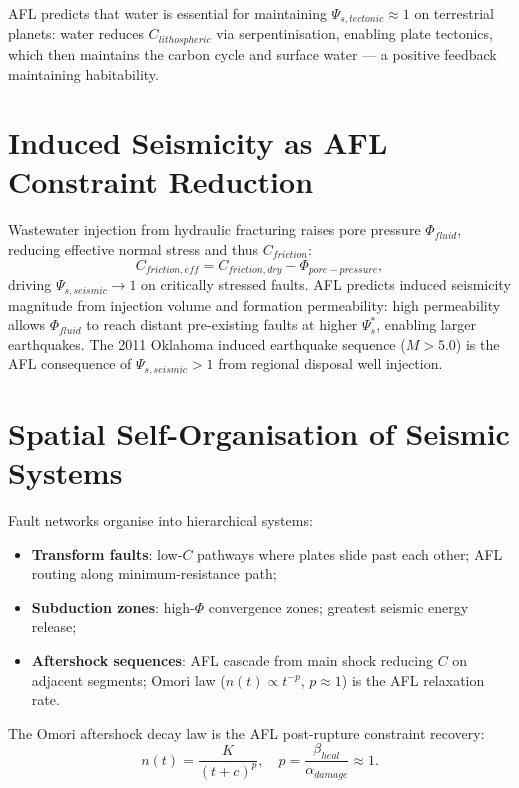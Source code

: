 \documentclass[11pt]{article}
\begin{document}
AFL predicts that water is essential for maintaining $\Psi_{s,tectonic} \approx 1$ on terrestrial
planets: water reduces $C_{lithospheric}$ via serpentinisation, enabling plate tectonics, which
then maintains the carbon cycle and surface water --- a positive feedback maintaining habitability.

\section{Induced Seismicity as AFL Constraint Reduction}

Wastewater injection from hydraulic fracturing raises pore pressure $\Phi_{fluid}$, reducing
effective normal stress and thus $C_{friction}$:
\begin{equation}
C_{friction,eff} = C_{friction,dry} - \Phi_{pore-pressure},
\end{equation}
driving $\Psi_{s,seismic} \to 1$ on critically stressed faults. AFL predicts induced seismicity
magnitude from injection volume and formation permeability: high permeability allows $\Phi_{fluid}$
to reach distant pre-existing faults at higher $\Psi_s^*$, enabling larger earthquakes. The 2011
Oklahoma induced earthquake sequence ($M > 5.0$) is the AFL consequence of $\Psi_{s,seismic} > 1$
from regional disposal well injection.

\section{Spatial Self-Organisation of Seismic Systems}

Fault networks organise into hierarchical systems:
\begin{itemize}
    \item \textbf{Transform faults}: low-$C$ pathways where plates slide past each other; AFL
          routing along minimum-resistance path;
    \item \textbf{Subduction zones}: high-$\Phi$ convergence zones; greatest seismic energy release;
    \item \textbf{Aftershock sequences}: AFL cascade from main shock reducing $C$ on adjacent
          segments; Omori law ($n(t) \propto t^{-p}$, $p \approx 1$) is the AFL relaxation rate.
\end{itemize}

The Omori aftershock decay law is the AFL post-rupture constraint recovery:
\begin{equation}
n(t) = \frac{K}{(t + c)^p}, \quad p = \frac{\beta_{heal}}{\alpha_{damage}} \approx 1.
\end{equation}
\end{document}
